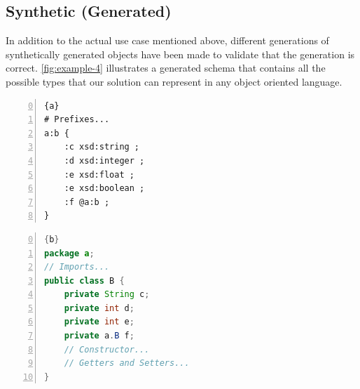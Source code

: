 \subsection{Synthetic (Generated)}
In addition to the actual use case mentioned above, different generations of synthetically generated objects have been made to validate that the generation is correct.
\cref{fig:example-4} illustrates a generated schema that contains all the possible types that our solution can represent in any object oriented language.

\begin{center}
	\noindent\begin{minipage}[t]{.4\textwidth}
		\begin{lstlisting}[frame=topline,numbers=left,firstnumber=0,title=\scriptsize\texttt{Synthetic.shexl}, basicstyle=\ttfamily\scriptsize]{a}
# Prefixes...
a:b {
	:c xsd:string ;
	:d xsd:integer ;
	:e xsd:float ;
	:e xsd:boolean ;
	:f @a:b ;
}
		\end{lstlisting}
	\end{minipage}\hfill
	\begin{minipage}[t]{.5\textwidth}
		\begin{lstlisting}[language=Java, frame=t,numbers=left,firstnumber=0,title=\scriptsize\texttt{Synthetic.java}, basicstyle=\ttfamily\scriptsize]{b}
package a;
// Imports...
public class B {
	private String c;
	private int d;
	private int e;
	private a.B f;
	// Constructor...
	// Getters and Setters...
}
		\end{lstlisting}
	\end{minipage}
	\label{fig:example-4}
\end{center}